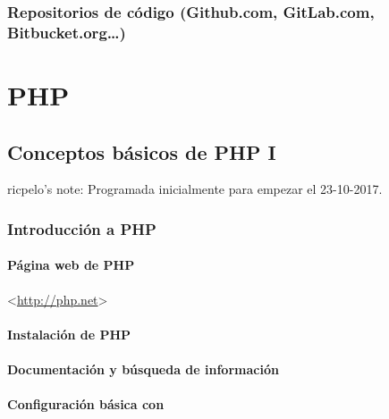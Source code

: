 \documentclass[a4paper,11pt,spanish]{sphinxmanual}
\begin{document}
\section{Repositorios de código (Github.com, GitLab.com, Bitbucket.org…)}
\label{\detokenize{introduccion:repositorios-de-codigo-github-com-gitlab-com-bitbucket-org}}

\part{PHP}
\label{\detokenize{php:php}}\label{\detokenize{php::doc}}

\chapter{Conceptos básicos de PHP I}
\label{\detokenize{php:conceptos-basicos-de-php-i}}
ricpelo's note: Programada inicialmente para empezar el 23-10-2017.


\section{Introducción a PHP}
\label{\detokenize{php:introduccion-a-php}}

\subsection{Página web de PHP}
\label{\detokenize{php:pagina-web-de-php}}
\textless{}\url{http://php.net}\textgreater{}


\subsection{Instalación de PHP}
\label{\detokenize{php:instalacion-de-php}}

\subsection{Documentación y búsqueda de información}
\label{\detokenize{php:documentacion-y-busqueda-de-informacion}}

\subsection{Configuración básica con }
\label{\detokenize{php:configuracion-basica-con-php-ini}}

\subsubsection{}
\label{\detokenize{php:error-reporting-e-all}}
\end{document}
